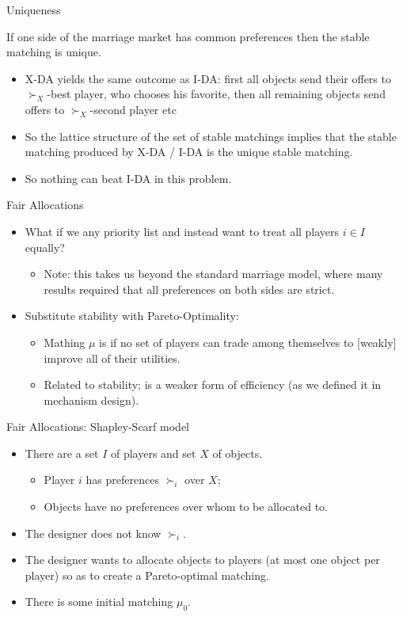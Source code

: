 \documentclass[english,10pt
,aspectratio=169
]{beamer}
\begin{document}
\begin{frame}{Uniqueness}
\begin{theorem}
	If one side of the marriage market has common preferences then the stable matching is \alert{unique}.
\end{theorem}
\begin{itemize}
	\item X-DA yields the same outcome as I-DA: first all objects send their offers to $\succ_X$-best player, who chooses his favorite, then all remaining objects send offers to $\succ_X$-second player etc
	\item So the lattice structure of the set of stable matchings implies that the stable matching produced by X-DA / I-DA is the unique stable matching.
	\item So nothing can beat I-DA in this problem.
\end{itemize}
\end{frame}


\begin{frame}{Fair Allocations}
\begin{itemize}
	\item What if we  any priority list  and instead want to treat all players $i \in I$ equally?
	\begin{itemize}
		\item Note: this takes us beyond the standard marriage model, where many results required that all preferences on both sides are strict.
	\end{itemize}
	\item Substitute stability with Pareto-Optimality:
	\begin{itemize}
		\item Mathing $\mu$ is  if no set of players can trade among themselves to [weakly] improve all of their utilities.
		\item Related to stability; is a weaker form of efficiency (as we defined it in mechanism design).
	\end{itemize}
\end{itemize}
\end{frame}


\begin{frame}{Fair Allocations: Shapley-Scarf model}
\begin{itemize}
	\item There are a set $I$ of players and set $X$ of objects.
	\begin{itemize}
		\item Player $i$ has preferences $\succ_i$ over $X$;
		\item Objects have no preferences over whom to be allocated to.
	\end{itemize}
	\item The designer does not know $\succ_i$.
	\item The designer wants to allocate objects to players (at most one object per player) so as to create a Pareto-optimal matching.
	\item There is some initial matching $\mu_0$.
\end{itemize}
\end{frame}
\end{document}
